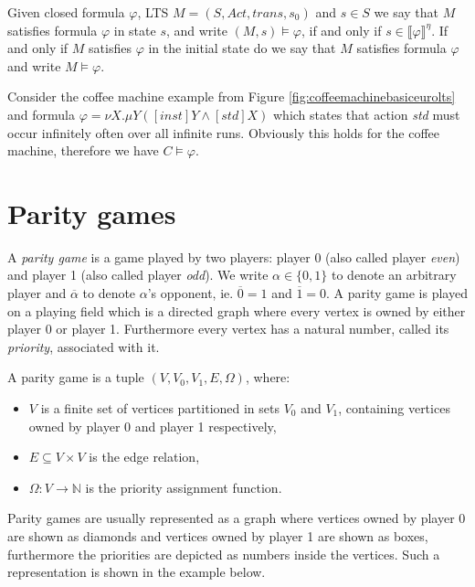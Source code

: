 Given closed formula $\varphi$, LTS $M = (S, Act, trans, s_0)$ and $s \in S$ we say that $M$ satisfies formula $\varphi$ in state $s$, and write $(M,s) \models \varphi$, if and only if $s \in \llbracket \varphi \rrbracket^\eta$. If and only if $M$ satisfies $\varphi$ in the initial state do we say that $M$ satisfies formula $\varphi$ and write $M \models \varphi$. 

\begin{example}
	Consider the coffee machine example from Figure \ref{fig:coffeemachinebasiceurolts} and formula $\varphi = \nu X. \mu Y([inst]Y \wedge [std]X)$ which states that action \textit{std} must occur infinitely often over all infinite runs. Obviously this holds for the coffee machine, therefore we have $C \models \varphi$.
\end{example}

\section{Parity games}
A \textit{parity game} is a game played by two players: player 0 (also called player \textit{even}) and player 1 (also called player \textit{odd}). We write $\alpha \in \{0,1\}$ to denote an arbitrary player and $\overline{\alpha}$ to denote $\alpha$'s opponent, ie. $\overline{0} = 1$ and $\overline{1} = 0$. A parity game is played on a playing field which is a directed graph where every vertex is owned by either player 0 or player 1. Furthermore every vertex has a natural number, called its \textit{priority}, associated with it.
\begin{definition}
	\label{def_PG}
	A parity game is a tuple $(V, V_0, V_1, E, \Omega)$, where:
	\begin{itemize}
		\item $V$ is a finite set of vertices partitioned in sets $V_0$ and $V_1$, containing vertices owned by player 0 and player 1 respectively,
		\item $E \subseteq V \times V$ is the edge relation,
		\item $\Omega :  V \rightarrow \mathbb{N}$ is the priority assignment function.
	\end{itemize}
\end{definition}
Parity games are usually represented as a graph where vertices owned by player 0 are shown as diamonds and vertices owned by player 1 are shown as boxes, furthermore the priorities are depicted as numbers inside the vertices. Such a representation is shown in the example below.

